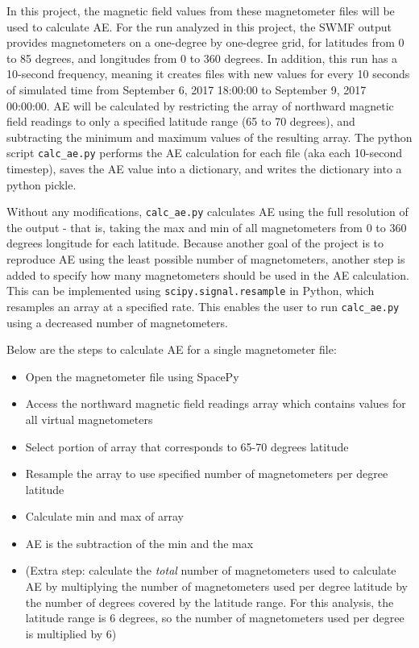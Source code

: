 \documentclass[12pt, letterpaper]{article}
\begin{document}
In this project, the magnetic field values from these magnetometer files will be used to calculate AE. For the run analyzed in this project, the SWMF output provides magnetometers on a one-degree by one-degree grid, for latitudes from 0 to 85 degrees, and longitudes from 0 to 360 degrees. In addition, this run has a 10-second frequency, meaning it creates files with new values for every 10 seconds of simulated time from September 6, 2017 18:00:00 to September 9, 2017 00:00:00.
AE will be calculated by restricting the array of northward magnetic field readings to only a specified latitude range (65 to 70 degrees), and subtracting the minimum and maximum values of the resulting array. The python script \texttt{calc\_ae.py} performs the AE calculation for each file (aka each 10-second timestep), saves the AE value into a dictionary, and writes the dictionary into a python pickle.

Without any modifications, \texttt{calc\_ae.py} calculates AE using the full resolution of the output - that is, taking the max and min of all magnetometers from 0 to 360 degrees longitude for each latitude. Because another goal of the project is to reproduce AE using the least possible number of magnetometers, another step is added to specify how many magnetometers should be used in the AE calculation. This can be implemented using \texttt{scipy.signal.resample} in Python, which resamples an array at a specified rate. This enables the user to run \texttt{calc\_ae.py} using a decreased number of magnetometers.

Below are the steps to calculate AE for a single magnetometer file:
\begin{itemize}
  \item Open the magnetometer file using SpacePy
  \item Access the northward magnetic field readings array which contains values for all virtual magnetometers
  \item Select portion of array that corresponds to 65-70 degrees latitude
  \item Resample the array to use specified number of magnetometers per degree latitude
  \item Calculate min and max of array
  \item AE is the subtraction of the min and the max
  \item (Extra step: calculate the \textit{total} number of magnetometers used to calculate AE by multiplying the number of magnetometers used per degree latitude by the number of degrees covered by the latitude range. For this analysis, the latitude range is 6 degrees, so the number of magnetometers used per degree is multiplied by 6)
\end{itemize}
\end{document}
